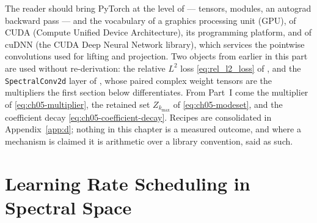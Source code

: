 The reader should bring PyTorch at the level of \cite{paszke2019pytorch} --- tensors,
modules, an autograd backward pass --- and the vocabulary of a graphics processing unit
(GPU), of CUDA (Compute Unified Device Architecture), its programming platform, and of cuDNN
(the CUDA Deep Neural Network library), which services the pointwise convolutions used for
lifting and projection. Two objects from earlier in this part are used without
re-derivation: the relative $L^2$ loss \eqref{eq:rel_l2_loss} of
, and the
\texttt{SpectralConv2d} layer of ,
whose paired complex weight tensors are the multipliers the first section below
differentiates. From Part~I come the multiplier of \eqref{eq:ch05-multiplier}, the retained
set $Z_{k_{\max}}$ of \eqref{eq:ch05-modeset}, and the coefficient decay
\eqref{eq:ch05-coefficient-decay}. Recipes are consolidated in Appendix~\ref{app:d}; nothing
in this chapter is a measured outcome, and where a mechanism is claimed it is arithmetic over
a library convention, said as such.

\section{Learning Rate Scheduling in Spectral Space}
\label{sec:ch26-schedule}

